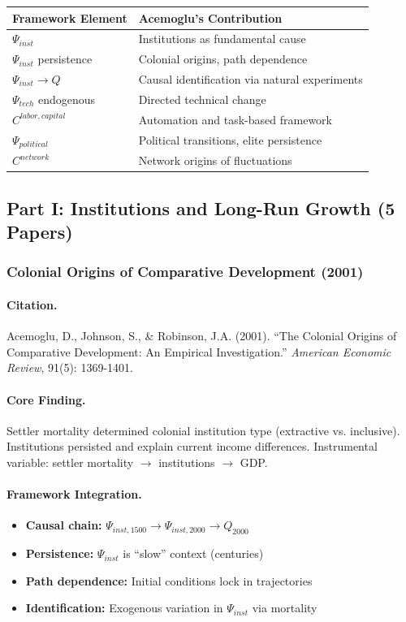 \begin{center}
\renewcommand{\arraystretch}{1.2}
\small
\begin{tabular}{ll}
\hline
\textbf{Framework Element} & \textbf{Acemoglu's Contribution} \\
\hline
$\Psi_{inst}$ & Institutions as fundamental cause \\
$\Psi_{inst}$ persistence & Colonial origins, path dependence \\
$\Psi_{inst} \to Q$ & Causal identification via natural experiments \\
$\Psi_{tech}$ endogenous & Directed technical change \\
$C^{labor,capital}$ & Automation and task-based framework \\
$\Psi_{political}$ & Political transitions, elite persistence \\
$C^{network}$ & Network origins of fluctuations \\
\hline
\end{tabular}
\end{center}

\subsection{Part I: Institutions and Long-Run Growth (5 Papers)}

\subsubsection{Colonial Origins of Comparative Development (2001)}

\paragraph{Citation.}
Acemoglu, D., Johnson, S., \& Robinson, J.A. (2001).
``The Colonial Origins of Comparative Development: An Empirical Investigation.''
\emph{American Economic Review}, 91(5): 1369-1401.

\paragraph{Core Finding.}
Settler mortality determined colonial institution type (extractive vs. inclusive).
Institutions persisted and explain current income differences.
Instrumental variable: settler mortality $\to$ institutions $\to$ GDP.

\paragraph{Framework Integration.}
\begin{itemize}
  \item \textbf{Causal chain:} $\Psi_{inst,1500} \to \Psi_{inst,2000} \to Q_{2000}$
  \item \textbf{Persistence:} $\Psi_{inst}$ is ``slow'' context (centuries)
  \item \textbf{Path dependence:} Initial conditions lock in trajectories
  \item \textbf{Identification:} Exogenous variation in $\Psi_{inst}$ via mortality
\end{itemize}

